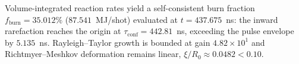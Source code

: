 Volume-integrated reaction rates yield a self-consistent burn fraction
$f_{\text{burn}} = 35.012\%$ ($87.541$~MJ/shot) evaluated at
$t = 437.675$~ns: the inward rarefaction reaches the origin at
$\tau_{\text{conf}} = 442.81$~ns, exceeding the pulse envelope by
$5.135$~ns.  Rayleigh--Taylor growth is bounded at gain
$4.82 \times 10^1$ and Richtmyer--Meshkov deformation remains linear,
$\xi/R_0 \approx 0.0482 < 0.10$.
